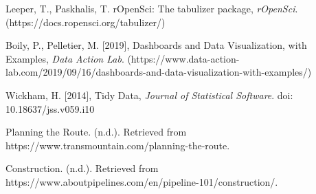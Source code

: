 \begin{thebibliography}{99}
 Leeper, T., Paskhalis, T. rOpenSci: The tabulizer package, {\it rOpenSci}. (https://docs.ropensci.org/tabulizer/)

 Boily, P., Pelletier, M. [2019], Dashboards and Data Visualization, with Examples, {\it Data Action Lab}. (https://www.data-action-lab.com/2019/09/16/dashboards-and-data-visualization-with-examples/)

 Wickham, H. [2014], Tidy Data, {\it Journal of Statistical Software}. doi: 10.18637/jss.v059.i10

 Planning the Route. (n.d.). Retrieved from https://www.transmountain.com/planning-the-route.

 Construction. (n.d.). Retrieved from https://www.aboutpipelines.com/en/pipeline-101/construction/.

\end{thebibliography}